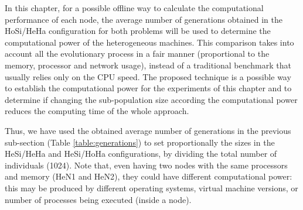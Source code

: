 In this chapter, for a possible offline way to calculate the computational performance of each node, %
 the average number of generations obtained in the
HoSi/HeHa configuration for both problems will be used to determine the
computational power of the heterogeneous machines. This comparison
takes into account all the evolutionary process in a fair manner
(proportional to the memory, processor and network usage), instead of a
traditional benchmark that usually relies only on the CPU
speed. %
The proposed technique is a possible way to establish the computational power for the experiments of this
chapter and to determine if changing the sub-population size according
the computational power reduces the computing time of the whole
approach. %

Thus, we have used the obtained average number of generations in the
previous sub-section (Table \ref{table:generations}) to set
proportionally the sizes in the HeSi/HeHa and HeSi/HoHa
configurations, by dividing the total number of individuals
(1024). Note that, even having two nodes with the same processors and
memory (HeN1 and HeN2), they could have different computational power:
this may be produced by different operating systems, virtual machine
versions, or number of processes being executed (inside a node). %



